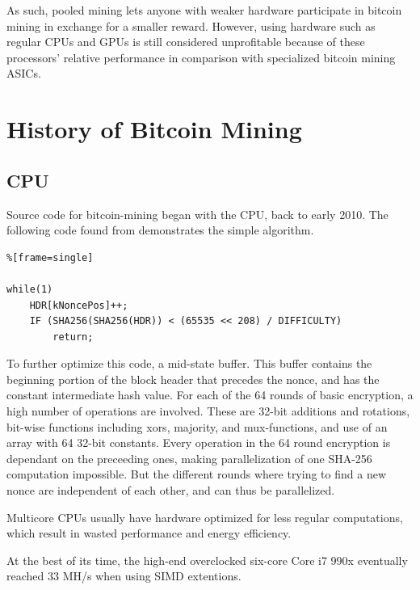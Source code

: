 As such, pooled mining lets anyone with weaker hardware participate in bitcoin mining in exchange for
a smaller reward. However, using hardware such as regular CPUs and GPUs is still considered unprofitable
because of these processors' relative performance in comparison with specialized bitcoin mining ASICs.

\section{History of Bitcoin Mining}


\subsection{CPU}
Source code for bitcoin-mining began with the CPU, back to early 2010. 
The following code found from \cite{bitcoin github} demonstrates the simple algorithm.      
       
\begin{lstlisting}%[frame=single]  

while(1)
    HDR[kNoncePos]++;
    IF (SHA256(SHA256(HDR)) < (65535 << 208) / DIFFICULTY)
        return;
\end{lstlisting}

To further optimize this code, a mid-state buffer.
This buffer contains the beginning portion of the block header that precedes the nonce, and has the constant intermediate hash value.
For each of the 64 rounds of basic encryption, a high number of operations are involved.
These are 32-bit additions and rotations, bit-wise functions including xors, majority, and mux-functions, and use of an array with 64 32-bit constants.
Every operation in the 64 round encryption is dependant on the preceeding ones, making parallelization of one SHA-256 computation impossible.
But the different rounds where trying to find a new nonce are independent of each other, and can thus be parallelized.

Multicore CPUs usually have hardware optimized for less regular computations, which result in wasted performance and energy efficiency. \cite{bespoke-silicon}

At the best of its time, the high-end overclocked six-core Core i7 990x eventually reached 33 MH/s when using SIMD extentions.


